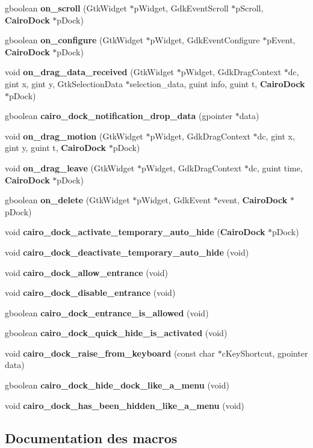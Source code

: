 \begin{CompactItemize}
gboolean {\bf on\_\-scroll} (GtkWidget $\ast$pWidget, GdkEventScroll $\ast$pScroll, {\bf CairoDock} $\ast$pDock)
\item 
gboolean {\bf on\_\-configure} (GtkWidget $\ast$pWidget, GdkEventConfigure $\ast$pEvent, {\bf CairoDock} $\ast$pDock)
\item 
void {\bf on\_\-drag\_\-data\_\-received} (GtkWidget $\ast$pWidget, GdkDragContext $\ast$dc, gint x, gint y, GtkSelectionData $\ast$selection\_\-data, guint info, guint t, {\bf CairoDock} $\ast$pDock)
\item 
gboolean {\bf cairo\_\-dock\_\-notification\_\-drop\_\-data} (gpointer $\ast$data)
\item 
void {\bf on\_\-drag\_\-motion} (GtkWidget $\ast$pWidget, GdkDragContext $\ast$dc, gint x, gint y, guint t, {\bf CairoDock} $\ast$pDock)
\item 
void {\bf on\_\-drag\_\-leave} (GtkWidget $\ast$pWidget, GdkDragContext $\ast$dc, guint time, {\bf CairoDock} $\ast$pDock)
\item 
gboolean {\bf on\_\-delete} (GtkWidget $\ast$pWidget, GdkEvent $\ast$event, {\bf CairoDock} $\ast$pDock)
\item 
void {\bf cairo\_\-dock\_\-activate\_\-temporary\_\-auto\_\-hide} ({\bf CairoDock} $\ast$pDock)
\item 
void {\bf cairo\_\-dock\_\-deactivate\_\-temporary\_\-auto\_\-hide} (void)
\item 
void {\bf cairo\_\-dock\_\-allow\_\-entrance} (void)
\item 
void {\bf cairo\_\-dock\_\-disable\_\-entrance} (void)
\item 
gboolean {\bf cairo\_\-dock\_\-entrance\_\-is\_\-allowed} (void)
\item 
gboolean {\bf cairo\_\-dock\_\-quick\_\-hide\_\-is\_\-activated} (void)
\item 
void {\bf cairo\_\-dock\_\-raise\_\-from\_\-keyboard} (const char $\ast$cKeyShortcut, gpointer data)
\item 
gboolean {\bf cairo\_\-dock\_\-hide\_\-dock\_\-like\_\-a\_\-menu} (void)
\item 
void {\bf cairo\_\-dock\_\-has\_\-been\_\-hidden\_\-like\_\-a\_\-menu} (void)
\end{CompactItemize}


\subsection{Documentation des macros}
